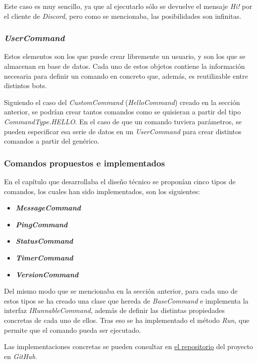 Este caso es muy sencillo, ya que al ejecutarlo sólo se devuelve el mensaje \textit{Hi!} por el cliente de \textit{Discord}, pero como se mencionaba, las posibilidades son infinitas.


\subsubsection{\textit{UserCommand}}

Estos elementos son los que puede crear libremente un usuario, y son los que se almacenan en base de datos. Cada uno de estos objetos contiene la información necesaria para definir un comando en concreto que, además, es reutilizable entre distintos bots.

Siguiendo el caso del \textit{CustomCommand} (\textit{HelloCommand}) creado en la sección anterior, se podrían crear tantos comandos como se quisieran a partir del tipo \textit{CommandType.HELLO}. En el caso de que un comando tuviera parámetros, se pueden especificar esa serie de datos en un \textit{UserCommand} para crear distintos comandos a partir del genérico.


\subsubsection{Comandos propuestos e implementados}

En el capítulo que desarrollaba el diseño técnico se proponían cinco tipos de comandos, los cuales han sido implementados, son los siguientes:

\begin{itemize}
	\item \textbf{\textit{MessageCommand}}
	\item \textbf{\textit{PingCommand}}
	\item \textbf{\textit{StatusCommand}}
	\item \textbf{\textit{TimerCommand}}
	\item \textbf{\textit{VersionCommand}}
\end{itemize}

Del mismo modo que se mencionaba en la sección anterior, para cada uno de estos tipos se ha creado una clase que hereda de \textit{BaseCommand} e implementa la interfaz \textit{IRunnableCommand}, además de definir las distintas propiedades concretas de cada uno de ellos. Tras eso se ha implementado el método \textit{Run}, que permite que el comando pueda ser ejecutado.

Las implementaciones concretas se pueden consultar en \href{https://github.com/harvestcore/matroos/tree/develop/resources/src/Matroos.Resources/Classes/Commands/CustomCommands}{el repositorio} del proyecto en \textit{GitHub}.

